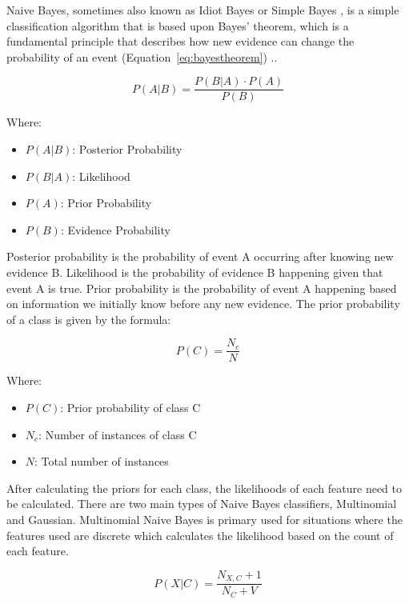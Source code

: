 Naive Bayes, sometimes also known as Idiot Bayes or Simple Bayes \cite{PDFIdiotsBayes2024}, is a simple classification algorithm that is based upon Bayes' theorem, which is a fundamental principle that describes how new evidence can change the probability of an event (Equation~\ref{eq:bayestheorem}) .\cite{lowdNaiveBayesModels2005}. 

\begin{equation}
    \label{eq:bayestheorem}
    P(A|B) = \frac{P(B|A) \cdot P(A)}{P(B)}
\end{equation}

Where:
\begin{itemize}
    \item $P(A|B)$: Posterior Probability
    \item $P(B|A)$: Likelihood
    \item $P(A)$: Prior Probability
    \item $P(B)$: Evidence Probability 
\end{itemize} 

Posterior probability is the probability of event A occurring after knowing new evidence B. Likelihood is the probability of evidence B happening given that event A is true. Prior probability is the probability of event A happening based on information we initially know before any new evidence. The prior probability of a class is given by the formula:

\begin{equation}
    \label{eq:prior}
    P(C) = \frac{N_c}{N}
\end{equation}

Where:
\begin{itemize}
    \item $P(C)$: Prior probability of class C
    \item $N_c$: Number of instances of class C
    \item $N$: Total number of instances
\end{itemize}

After calculating the priors for each class, the likelihoods of each feature need to be calculated. There are two main types of Naive Bayes classifiers, Multinomial and Gaussian. Multinomial Naive Bayes is primary used for situations where the features used are discrete which calculates the likelihood based on the count of each feature.

\begin{equation}
    \label{eq:multinomial}
    P(X | C) = \frac{N_{X,C} + 1}{N_C + V}
\end{equation}

